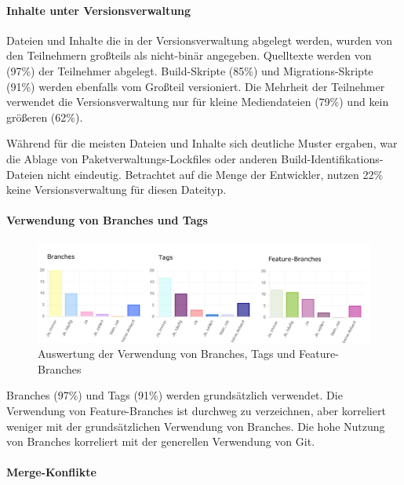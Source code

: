 \paragraph{Inhalte unter Versionsverwaltung}

Dateien und Inhalte die in der Versionsverwaltung abgelegt werden, wurden von den Teilnehmern großteils als nicht-binär angegeben. Quelltexte werden von (97\%) der Teilnehmer abgelegt. Build-Skripte (85\%) und Migrations-Skripte (91\%) werden ebenfalls vom Großteil versioniert. Die Mehrheit der Teilnehmer verwendet die Versionsverwaltung nur für kleine Mediendateien (79\%) und kein größeren (62\%).

Während für die meisten Dateien und Inhalte sich deutliche Muster ergaben, war die Ablage von Paketverwaltungs-Lockfiles oder anderen Build-Identifikations-Dateien nicht eindeutig. Betrachtet auf die Menge der Entwickler, nutzen 22\% keine Versionsverwaltung für diesen Dateityp.

\pagebreak

\paragraph{Verwendung von Branches und Tags}

\begin{figure}[htbp]
  \includegraphics[width=\textwidth, height=\textheight, keepaspectratio]
    {resources/survey-vcs-branches.pdf}
  \caption{Auswertung der Verwendung von Branches, Tags und Feature-Branches}
\end{figure}

Branches (97\%) und Tags (91\%) werden grundsätzlich verwendet. Die Verwendung von Feature-Branches ist durchweg zu verzeichnen, aber korreliert weniger mit der grundsätzlichen Verwendung von Branches. Die hohe Nutzung von Branches korreliert mit der generellen Verwendung von Git.

\paragraph{Merge-Konflikte}

